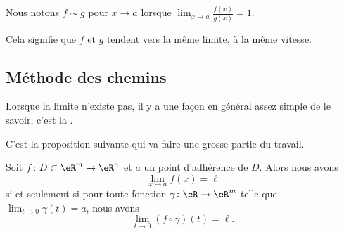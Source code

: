 \begin{normaltext}
    Nous notons \( f\sim g\) pour \( x\to a\) lorsque \( \lim_{x\to a} \frac{ f(x) }{ g(x) }=1\).

    Cela signifie que \( f\) et \( g\) tendent vers la même limite, à la même vitesse.
\end{normaltext}

\subsection{Méthode des chemins}

Lorsque la limite n'existe pas, il y a une façon en général assez simple de le savoir, c'est la .

\newcommand{\CaptionFigMethodeChemin}{Sur toute la droite $y=-x$, la fonction vaut $-1/2$, tandis que sur toute la droite $y=x/2$, elle vaut $\frac{2}{ 5 }$. Il est donc impossible que la fonction ait une limite en $(0,0)$, parce que dans toute boule autour de zéro, il y aura toujours un point de chacune de ces deux droites.}


C'est la proposition suivante qui va faire une grosse partie du travail.  
\begin{proposition}     \label{PROPooSAFIooWvmSiT}
	Soit $f\colon D\subset\eR^m\to \eR^n$ et $a$ un point d'adhérence de $D$. Alors nous avons
	\begin{equation}
		\lim_{x\to a} f(x)=\ell
	\end{equation}
	si et seulement si pour toute fonction $\gamma\colon \eR\to \eR^m$ telle que $\lim_{t\to 0} \gamma(t)=a$, nous avons
	\begin{equation}
		\lim_{t\to 0} (f\circ\gamma)(t)=\ell.
	\end{equation}
\end{proposition}

